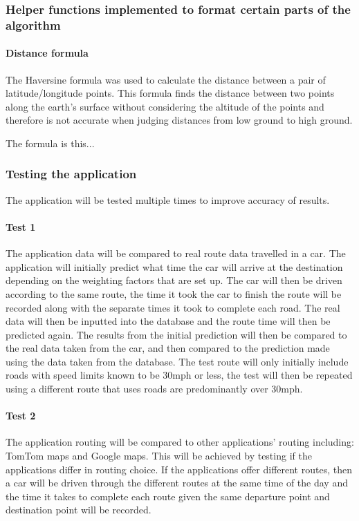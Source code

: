 \documentclass[12pt,a4paper]{article}
\begin{document}
\subsubsection{Helper functions implemented to format certain parts of the algorithm}

\paragraph{Distance formula}
The Haversine formula was used to calculate the distance between a pair of latitude/longitude points. This formula finds the distance between two points along the earth's surface without considering the altitude of the points and therefore is not accurate when judging distances from low ground to high ground. 

The formula is this...

\subsubsection{Testing the application}
The application will be tested multiple times to improve accuracy of results. 

\paragraph{Test 1}
The application data will be compared to real route data travelled in a car. The application will initially predict what time the car will arrive at the destination depending on the weighting factors that are set up. The car will then be driven according to the same route, the time it took the car to finish the route will be recorded along with the separate times it took to complete each road. The real data will then be inputted into the database and the route time will then be predicted again. The results from the initial prediction will then be compared to the real data taken from the car, and then compared to the prediction made using the data taken from the database. The test route will only initially include roads with speed limits known to be 30mph or less, the test will then be repeated using a different route that uses roads are predominantly over 30mph.

\paragraph{Test 2}
The application routing will be compared to other applications' routing including: TomTom maps and Google maps. This will be achieved by testing if the applications differ in routing choice. If the applications offer different routes, then a car will be driven through the different routes at the same time of the day and the time it takes to complete each route given the same departure point and destination point will be recorded.
\end{document}
